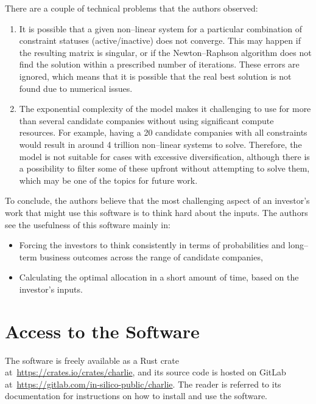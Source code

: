 \documentclass{article}
\begin{document}
\noindent There are a couple of technical problems that the authors observed:
\begin{enumerate}
    \item It is possible that a given non--linear system for a particular
    combination of constraint statuses (active/inactive) does not converge. This
    may happen if the resulting matrix is singular, or if the Newton--Raphson
    algorithm does not find the solution within a prescribed number of
    iterations. These errors are ignored, which means that it is possible that
    the real best solution is not found due to numerical issues.
    \item The exponential complexity of the model makes it challenging to
    use for more than several candidate companies without using significant
    compute resources. For example, having a 20 candidate companies with all
    constraints would result in around 4 trillion non--linear systems to solve.
    Therefore, the model is not suitable for cases with excessive
    diversification, although there is a possibility to filter some of these
    upfront without attempting to solve them, which may be one of the topics for
    future work.
\end{enumerate}

\indent To conclude, the authors believe that the most challenging aspect of an
investor's work that might use this software is to think hard about the inputs.
The authors see the usefulness of this software mainly in:
\begin{itemize}
    \item Forcing the investors to think consistently in terms of probabilities
    and long--term business outcomes across the range of candidate companies,
    \item Calculating the optimal allocation in a short amount of time, based on
    the investor's inputs.
\end{itemize}

\section{Access to the Software}

\noindent The software is freely available as a Rust crate
at~\url{https://crates.io/crates/charlie}, and its source code is hosted on
GitLab at~\url{https://gitlab.com/in-silico-public/charlie}. The reader is
referred to its documentation for instructions on how to install and use the
software.

\clearpage



\end{document}

